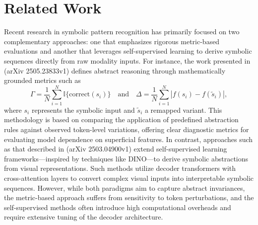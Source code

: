 \documentclass{article}
\begin{document}
\section{Related Work}
Recent research in symbolic pattern recognition has primarily focused on two complementary approaches: one that emphasizes rigorous metric-based evaluations and another that leverages self-supervised learning to derive symbolic sequences directly from raw modality inputs. For instance, the work presented in (arXiv 2505.23833v1) defines abstract reasoning through mathematically grounded metrics such as 
\[
\Gamma = \frac{1}{N} \sum_{i=1}^{N} \mathbb{I}\{ \text{correct}(s_i) \} \quad \text{and} \quad \Delta = \frac{1}{N} \sum_{i=1}^{N} \left| f(s_i) - f(\tilde{s}_i) \right|,
\]
where \( s_i \) represents the symbolic input and \( \tilde{s}_i \) a remapped variant. This methodology is based on comparing the application of predefined abstraction rules against observed token-level variations, offering clear diagnostic metrics for evaluating model dependence on superficial features. In contrast, approaches such as that described in (arXiv 2503.04900v1) extend self-supervised learning frameworks—inspired by techniques like DINO—to derive symbolic abstractions from visual representations. Such methods utilize decoder transformers with cross-attention layers to convert complex visual inputs into interpretable symbolic sequences. However, while both paradigms aim to capture abstract invariances, the metric-based approach suffers from sensitivity to token perturbations, and the self-supervised methods often introduce high computational overheads and require extensive tuning of the decoder architecture.
\end{document}
